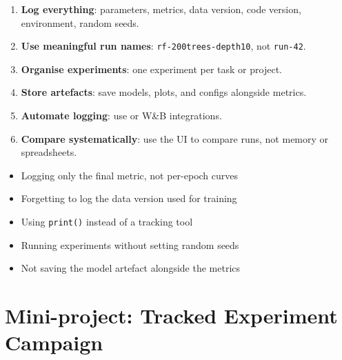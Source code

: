 \begin{bestpractice}[title=\textbf{Experiment tracking golden rules}]
\begin{enumerate}
  \item \textbf{Log everything}: parameters, metrics, data version, code
    version, environment, random seeds.
  \item \textbf{Use meaningful run names}: \texttt{rf-200trees-depth10},
    not \texttt{run-42}.
  \item \textbf{Organise experiments}: one experiment per task or project.
  \item \textbf{Store artefacts}: save models, plots, and configs alongside
    metrics.
  \item \textbf{Automate logging}: use  or W\&B
    integrations.
  \item \textbf{Compare systematically}: use the UI to compare runs, not
    memory or spreadsheets.
\end{enumerate}
\end{bestpractice}

\begin{antipattern}[title=\textbf{Common anti-patterns}]
\begin{itemize}
  \item Logging only the final metric, not per-epoch curves
  \item Forgetting to log the data version used for training
  \item Using \texttt{print()} instead of a tracking tool
  \item Running experiments without setting random seeds
  \item Not saving the model artefact alongside the metrics
\end{itemize}
\end{antipattern}

\section{Mini-project: Tracked Experiment Campaign}
\label{sec:mini-project-ch4}

